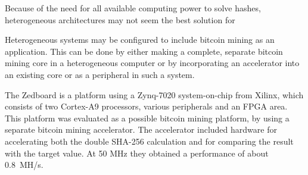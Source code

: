 Because of the need for all available computing power to solve hashes, heterogeneous architectures
may not seem the best solution for 

Heterogeneous systems may be configured to include bitcoin mining as an application. This can be
done by either making a complete, separate bitcoin mining core in a heterogeneous computer
or by incorporating an accelerator into an existing core or as a peripheral in such a system.

The Zedboard is a platform using a Zynq-7020 system-on-chip from Xilinx, which consists of
two Cortex-A9 processors, various peripherals and an FPGA area. This platform was evaluated
as a possible bitcoin mining platform, by using a separate bitcoin mining
accelerator. The accelerator included hardware for accelerating both the double SHA-256 calculation
and for comparing the result with the target value. At 50 MHz they obtained a performance of about
0.8~MH/s. \cite{xcell-bitcoin,standridge-master}



